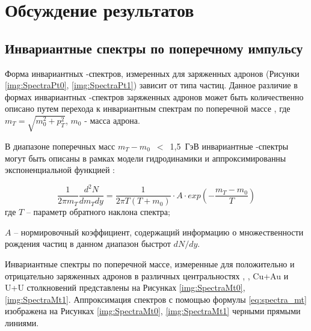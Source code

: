 \chapter{Обсуждение результатов} \label{chapt5}

\section{Инвариантные спектры по поперечному импульсу} \label{sect5_spectra}

Форма инвариантных \pt-спектров, измеренных для заряженных адронов (Рисунки \ref{img:SpectraPt0}, \ref{img:SpectraPt1}) зависит от типа частиц.
Данное различие в формах инвариантных \pt-спектров заряженных адронов может быть количественно описано путем перехода к инвариантным спектрам по поперечной массе \mt, где $m_T = \sqrt{m_{0}^{2} + p_{T}^{2}}$, $m_0$ - масса адрона. 

В диапазоне поперечных масс $m_T-m_0$~$<$~1,5~ГэВ инвариантные \mt-спектры могут быть описаны в рамках модели гидродинамики \cite{PPG026, HydroPartonicCascade} и аппроксимированны экспоненциальной функцией \cite{ToutModels}:

\begin{equation}
	\label{eq:spectra_mt}
	\frac{1}{2\pi m_T} \frac{d^2 N}{dm_T dy}=\frac{1}{2\pi T (T+m_0)}\cdot A \cdot exp \left( -\frac{m_T - m_0}{T}\right)
\end{equation}
где $T$ -- параметр обратного наклона спектра;

$A$ -- нормировочный коэффициент, содержащий информацию о множественности рождения частиц в данном диа­пазон быстрот $dN/dy$.

Инвариантные спектры по поперечной массе, измеренные для положительно и отрицательно заряженных адронов в различных центральностях \pal, \heau, Cu+Au и U+U столкновений представлены на Рисунках \ref{img:SpectraMt0}, \ref{img:SpectraMt1}. Аппроксимация спектров с помощью формулы \ref{eq:spectra_mt} изображена на Рисунках \ref{img:SpectraMt0}, \ref{img:SpectraMt1} черными прямыми линиями.

